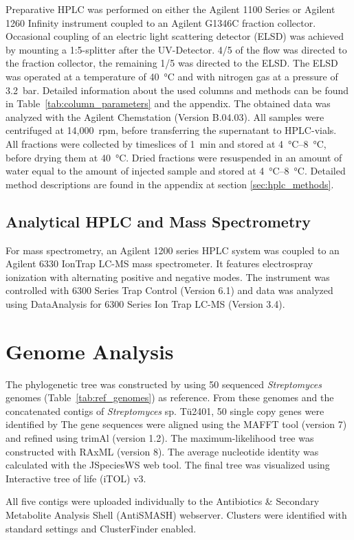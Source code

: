	Preparative HPLC was performed on either the Agilent 1100 Series or Agilent 1260 Infinity instrument coupled to an Agilent G1346C fraction collector. Occasional coupling of an electric light scattering detector (ELSD) was achieved by mounting a 1:5-splitter after the UV-Detector. 4/5 of the flow was directed to the fraction collector, the remaining 1/5 was directed to the ELSD. The ELSD was operated at a temperature of \SI{40}{\celsius} and with nitrogen gas at a pressure of \SI{3.2}{\bar}. Detailed information about the used columns and methods can be found in Table~\ref{tab:column_parameters} and the appendix. The obtained data was analyzed with the Agilent Chemstation (Version B.04.03).
	All samples were centrifuged at 14,000~rpm, before transferring the supernatant to HPLC-vials. All fractions were collected by timeslices of \SI{1}{\minute} and stored at \SIrange{4}{8}{\celsius}, before drying them at \SI{40}{\celsius}. Dried fractions were resuspended in an amount of water equal to the amount of injected sample and stored at \SIrange{4}{8}{\celsius}. Detailed method descriptions are found in the appendix at section \ref{sec:hplc_methods}.


	\subsection{Analytical HPLC and Mass Spectrometry} %
	\label{sub:analytical_hplc_and_mass_spectrometry}


	For mass spectrometry, an Agilent 1200 series HPLC system was coupled to an Agilent 6330 IonTrap LC-MS mass spectrometer. It features electrospray ionization with alternating positive and negative modes. The instrument was controlled with 6300 Series Trap Control (Version 6.1) and data was analyzed using DataAnalysis for 6300 Series Ion Trap LC-MS (Version 3.4).


\section{Genome Analysis} %
\label{sec:genome_analysis}

	The phylogenetic tree was constructed by using 50 sequenced \textit{Streptomyces} genomes (Table~\ref{tab:ref_genomes}) as reference. From these genomes and the concatenated contigs of \textit{Streptomyces} sp. Tü2401, 50 single copy genes were identified by
	The gene sequences were aligned using the MAFFT tool (version 7) and refined using trimAl (version 1.2).\autocite{Katoh2017,Kuraku2013,Capella-Gutierrez2009} The maximum-likelihood tree was constructed with RAxML (version 8).\autocite{Stamatakis2014} The average nucleotide identity was calculated with the JSpeciesWS web tool.\autocite{Richter2017} The final tree was visualized using Interactive tree of life (iTOL) v3.\autocite{Letunic2016}

	All five contigs were uploaded individually to the Antibiotics \& Secondary Metabolite Analysis Shell (AntiSMASH) webserver.  \autocite{Weber2015,Blin2013,Medema2011} Clusters were identified with standard settings and ClusterFinder enabled.



